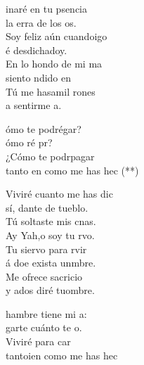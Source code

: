 \documentclass[12pt]{article}
\begin{document}
\begin{multicols*}{2}
\begin{cancion}%
	inaré en tu psencia \\
	 la erra de los os.\\
	Soy feliz aún cuandoigo \\
	é desdichadoy.\\
	En lo hondo de mi ma \\
	siento ndido en   \\
	Tú me hasamil rones \\
	a sentirme a. \\
	\begin{chorus}%
	ómo te podrégar?\\
	ómo ré pr?\\
	¿Cómo te podrpagar \\
	tanto en como me has hec (**)\\
	\end{chorus}%
	Viviré cuanto me has dic \\
	sí, dante de tueblo.\\
	Tú soltaste mis cnas.\\
	Ay Yah,o soy tu rvo. \\
	Tu siervo para rvir \\
	á doe exista unmbre.\\
	Me ofrece sacricio  \\
	y ados diré tuombre.\\
	\begin{chorus}%
	hambre tiene mi a:\\
	garte cuánto te o.\\
	Viviré para car \\
	tantoien como me has hec \\

\end{chorus}
\end{cancion}
\end{multicols*}
\end{document}
